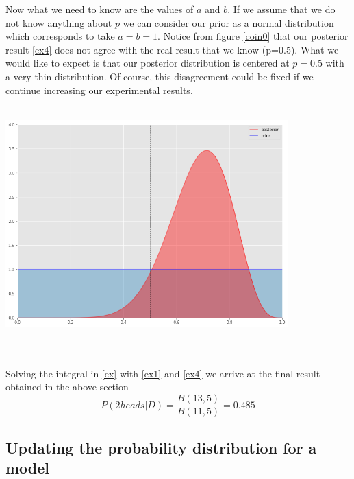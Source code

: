 \documentclass[onecolumn,           %
               showpacs,            %
               preprintnumbers,     %
               aps,                 %
               prl,          	    %
               letterpaper,             %
               superscriptaddress,      %
               nofootinbib,         %
               tightenlines,        %
               floats,floatfix      %
               ,usenatbib,
               ]{revtex4-1}
\begin{document}
Now what we need to know are the values of $a$ and $b$. If we assume that we do not know anything about $p$ we can consider our prior as a normal distribution which corresponds to take $a=b=1$. 
Notice from figure \ref{coin0} that our posterior result \eqref{ex4} does not agree with the real result that we know (p=0.5). What we would like to expect is that our posterior distribution is centered at $p=0.5$ with a very thin distribution. Of course, this disagreement could be fixed if we continue increasing our experimental results.\\ $ $\\
\begin{minipage}{\textwidth}
\centering
\includegraphics[height=8cm]{coin0.png}
\label{coin0}
\end{minipage}
\\$ $ \\
Solving the integral in \eqref{ex} with \eqref{ex1} and \eqref{ex4} we arrive at the final result obtained in the above section
\begin{equation}
P(2heads|D)=\frac{B(13,5)}{B(11,5)}=0.485
\end{equation}
%
%
%
\subsection{Updating the probability distribution for a model} 
\end{document}
